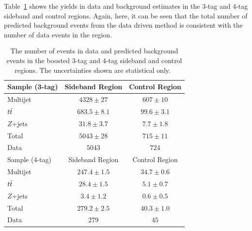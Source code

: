 Table~\ref{tab:4b_control} shows the yields in data and background estimates in the $3$-tag and $4$-tag sideband and control regions. Again, here, it can be seen that the total number of predicted background events from the data driven method is consistent with the number of data events in the region. 

\begin{table}[!ht]
\begin{center}
\begin{tabular}{ l c  c  }
\toprule
 Sample (3-tag) & Sideband Region       & Control Region  \\ 
\midrule
Multijet        & $4328   \pm 27$       & $607  \pm  10$  \\
$t\bar{t}$          & $683.5  \pm 8.1$      & $99.6 \pm  3.1$ \\
$Z$+jets        & $31.8   \pm 3.7$      & $7.7  \pm  1.8$ \\
\midrule
Total           & $5043 \pm 28$     & $715\pm  11$ \\
\midrule
Data            & $5043$                  & $724$     \\  
\toprule
  Sample (4-tag) & Sideband Region      & Control Region  \\ 
\midrule
Multijet         & $247.4 \pm 1.5$      & $34.7  \pm  0.6$ \\
$t\bar{t}$           & $28.4  \pm 1.5$      & $5.1   \pm  0.7$ \\
$Z$+jets         & $3.4   \pm 1.2$      & $0.6   \pm  0.5$  \\
\midrule
Total            & $279.2 \pm 2.5$     & $40.3  \pm  1.0$  \\
\midrule
Data             & $279$                  & $45$     \\ 
\bottomrule
\end{tabular}
\caption{The number of events in data and predicted background events in the boosted $3$-tag and $4$-tag sideband and control
  regions. The uncertainties shown are statistical only.~\cite{4bconf}}
\label{tab:4b_control} 
\end{center}
\end{table}


